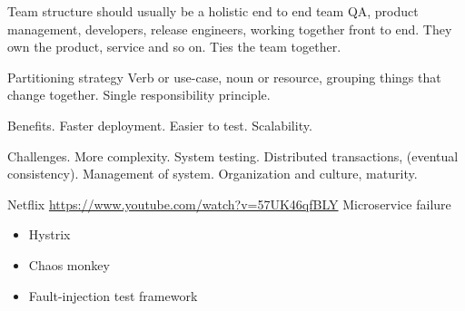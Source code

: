 Team structure should usually be a holistic end to end team QA, product management, developers, release engineers, working together front to end. They own the product, service and so on. Ties the team together.

Partitioning strategy Verb or use-case, noun or resource, grouping things that change together. Single responsibility principle.

Benefits. Faster deployment. Easier to test. Scalability.

Challenges.
More complexity. System testing. Distributed transactions, (eventual consistency). Management of system.
Organization and culture, maturity.

Netflix
\url{https://www.youtube.com/watch?v=57UK46qfBLY}
Microservice failure
\begin{itemize}
\item Hystrix
\item Chaos monkey
\item Fault-injection test framework
\end{itemize}